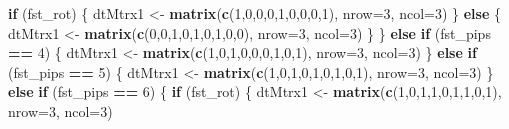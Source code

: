 \documentclass[
]{article}
\newenvironment{Shaded}{\begin{snugshade}}{\end{snugshade}}
\newcommand{\AttributeTok}[1]{\textcolor[rgb]{0.13,0.29,0.53}{#1}}
\newcommand{\ControlFlowTok}[1]{\textcolor[rgb]{0.13,0.29,0.53}{\textbf{#1}}}
\newcommand{\DecValTok}[1]{\textcolor[rgb]{0.00,0.00,0.81}{#1}}
\newcommand{\FunctionTok}[1]{\textcolor[rgb]{0.13,0.29,0.53}{\textbf{#1}}}
\newcommand{\NormalTok}[1]{#1}
\newcommand{\OtherTok}[1]{\textcolor[rgb]{0.56,0.35,0.01}{#1}}
\newcommand{\SpecialCharTok}[1]{\textcolor[rgb]{0.81,0.36,0.00}{\textbf{#1}}}
\begin{document}
\begin{Shaded}
\begin{Highlighting}[]
    \ControlFlowTok{if}\NormalTok{ (fst\_rot) \{}
\NormalTok{      dtMtrx1 }\OtherTok{\textless{}{-}} \FunctionTok{matrix}\NormalTok{(}\FunctionTok{c}\NormalTok{(}\DecValTok{1}\NormalTok{,}\DecValTok{0}\NormalTok{,}\DecValTok{0}\NormalTok{,}\DecValTok{0}\NormalTok{,}\DecValTok{1}\NormalTok{,}\DecValTok{0}\NormalTok{,}\DecValTok{0}\NormalTok{,}\DecValTok{0}\NormalTok{,}\DecValTok{1}\NormalTok{), }\AttributeTok{nrow=}\DecValTok{3}\NormalTok{, }\AttributeTok{ncol=}\DecValTok{3}\NormalTok{)}
\NormalTok{    \} }\ControlFlowTok{else}\NormalTok{ \{}
\NormalTok{      dtMtrx1 }\OtherTok{\textless{}{-}} \FunctionTok{matrix}\NormalTok{(}\FunctionTok{c}\NormalTok{(}\DecValTok{0}\NormalTok{,}\DecValTok{0}\NormalTok{,}\DecValTok{1}\NormalTok{,}\DecValTok{0}\NormalTok{,}\DecValTok{1}\NormalTok{,}\DecValTok{0}\NormalTok{,}\DecValTok{1}\NormalTok{,}\DecValTok{0}\NormalTok{,}\DecValTok{0}\NormalTok{), }\AttributeTok{nrow=}\DecValTok{3}\NormalTok{, }\AttributeTok{ncol=}\DecValTok{3}\NormalTok{)}
\NormalTok{    \}}
\NormalTok{  \} }\ControlFlowTok{else} \ControlFlowTok{if}\NormalTok{ (fst\_pips }\SpecialCharTok{==} \DecValTok{4}\NormalTok{) \{}
\NormalTok{    dtMtrx1 }\OtherTok{\textless{}{-}} \FunctionTok{matrix}\NormalTok{(}\FunctionTok{c}\NormalTok{(}\DecValTok{1}\NormalTok{,}\DecValTok{0}\NormalTok{,}\DecValTok{1}\NormalTok{,}\DecValTok{0}\NormalTok{,}\DecValTok{0}\NormalTok{,}\DecValTok{0}\NormalTok{,}\DecValTok{1}\NormalTok{,}\DecValTok{0}\NormalTok{,}\DecValTok{1}\NormalTok{), }\AttributeTok{nrow=}\DecValTok{3}\NormalTok{, }\AttributeTok{ncol=}\DecValTok{3}\NormalTok{) }
\NormalTok{  \} }\ControlFlowTok{else} \ControlFlowTok{if}\NormalTok{ (fst\_pips }\SpecialCharTok{==} \DecValTok{5}\NormalTok{) \{}
\NormalTok{    dtMtrx1 }\OtherTok{\textless{}{-}} \FunctionTok{matrix}\NormalTok{(}\FunctionTok{c}\NormalTok{(}\DecValTok{1}\NormalTok{,}\DecValTok{0}\NormalTok{,}\DecValTok{1}\NormalTok{,}\DecValTok{0}\NormalTok{,}\DecValTok{1}\NormalTok{,}\DecValTok{0}\NormalTok{,}\DecValTok{1}\NormalTok{,}\DecValTok{0}\NormalTok{,}\DecValTok{1}\NormalTok{), }\AttributeTok{nrow=}\DecValTok{3}\NormalTok{, }\AttributeTok{ncol=}\DecValTok{3}\NormalTok{)}
\NormalTok{  \} }\ControlFlowTok{else} \ControlFlowTok{if}\NormalTok{ (fst\_pips }\SpecialCharTok{==} \DecValTok{6}\NormalTok{) \{}
    \ControlFlowTok{if}\NormalTok{ (fst\_rot) \{}
\NormalTok{      dtMtrx1 }\OtherTok{\textless{}{-}} \FunctionTok{matrix}\NormalTok{(}\FunctionTok{c}\NormalTok{(}\DecValTok{1}\NormalTok{,}\DecValTok{0}\NormalTok{,}\DecValTok{1}\NormalTok{,}\DecValTok{1}\NormalTok{,}\DecValTok{0}\NormalTok{,}\DecValTok{1}\NormalTok{,}\DecValTok{1}\NormalTok{,}\DecValTok{0}\NormalTok{,}\DecValTok{1}\NormalTok{), }\AttributeTok{nrow=}\DecValTok{3}\NormalTok{, }\AttributeTok{ncol=}\DecValTok{3}\NormalTok{)}

\end{Highlighting}
\end{Shaded}
\end{document}
